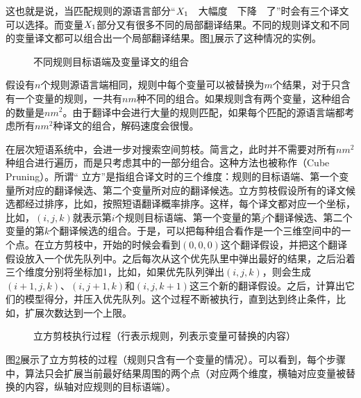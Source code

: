 \parinterval 这也就是说，当匹配规则的源语言部分“${X}_1$\ \ 大幅度\ \ 下降\ \ 了”时会有三个译文可以选择。而变量${X}_1$部分又有很多不同的局部翻译结果。不同的规则译文和不同的变量译文都可以组合出一个局部翻译结果。图\ref{fig:8-12}展示了这种情况的实例。

\begin{figure}[htp]
\centering

\caption{不同规则目标语端及变量译文的组合}
\label{fig:8-12}
\end{figure}

\parinterval 假设有$n$个规则源语言端相同，规则中每个变量可以被替换为$m$个结果，对于只含有一个变量的规则，一共有$nm$种不同的组合。如果规则含有两个变量，这种组合的数量是$n{m}^2$。由于翻译中会进行大量的规则匹配，如果每个匹配的源语言端都考虑所有$n{m}^2$种译文的组合，解码速度会很慢。

\parinterval 在层次短语系统中，会进一步对搜索空间剪枝。简言之，此时并不需要对所有$n{m}^2$种组合进行遍历，而是只考虑其中的一部分组合。这种方法也被称作{\small{}}（Cube Pruning）。所谓“ 立方”是指组合译文时的三个维度：规则的目标语端、第一个变量所对应的翻译候选、第二个变量所对应的翻译候选。立方剪枝假设所有的译文候选都经过排序，比如，按照短语翻译概率排序。这样，每个译文都对应一个坐标，比如，$(i,j,k)$就表示第$i$个规则目标语端、第一个变量的第$j$个翻译候选、第二个变量的第$k$个翻译候选的组合。于是，可以把每种组合看作是一个三维空间中的一个点。在立方剪枝中，开始的时候会看到$(0,0,0)$这个翻译假设，并把这个翻译假设放入一个优先队列中。之后每次从这个优先队里中弹出最好的结果，之后沿着三个维度分别将坐标加1，比如，如果优先队列弹出$(i,j,k)$，则会生成$(i+1,j,k)$、$(i,j+1,k)$和$(i,j,k+1)$这三个新的翻译假设。之后，计算出它们的模型得分，并压入优先队列。这个过程不断被执行，直到达到终止条件，比如，扩展次数达到一个上限。

\begin{figure}[htp]
\centering

\caption{立方剪枝执行过程（行表示规则，列表示变量可替换的内容）}
\label{fig:8-13}
\end{figure}

\parinterval 图\ref{fig:8-13}展示了立方剪枝的过程（规则只含有一个变量的情况）。可以看到，每个步骤中，算法只会扩展当前最好结果周围的两个点（对应两个维度，横轴对应变量被替换的内容，纵轴对应规则的目标语端）。

